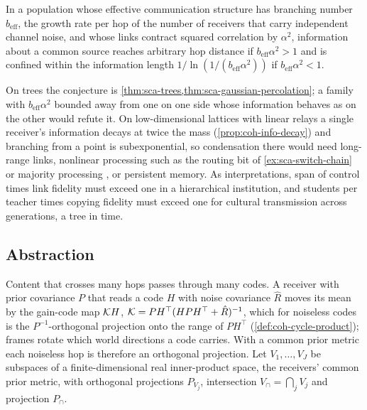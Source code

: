 \begin{conjecture}\label{conj:sca-condensation}
In a population whose effective communication structure has branching number $b_{\mathrm{eff}}$, the growth rate per hop of the number of receivers that carry independent channel noise, and whose links contract squared correlation by $\alpha^2$, information about a common source reaches arbitrary hop distance if $b_{\mathrm{eff}}\alpha^2>1$ and is confined within the information length $1/\ln(1/(b_{\mathrm{eff}}\alpha^2))$ if $b_{\mathrm{eff}}\alpha^2<1$.
\end{conjecture}
On trees the conjecture is \cref{thm:sca-trees,thm:sca-gaussian-percolation}; a family with $b_{\mathrm{eff}}\alpha^2$ bounded away from one on one side whose information behaves as on the other would refute it. On low-dimensional lattices with linear relays a single receiver's information decays at twice the mass (\cref{prop:coh-info-decay}) and branching from a point is subexponential, so condensation there would need long-range links, nonlinear processing such as the routing bit of \cref{ex:sca-switch-chain} or majority processing \citep{makur2020broadcasting}, or persistent memory. As interpretations, span of control times link fidelity must exceed one in a hierarchical institution, and students per teacher times copying fidelity must exceed one for cultural transmission across generations, a tree in time.

\subsection{Abstraction}\label{sec:sca-abstraction}

Content that crosses many hops passes through many codes. A receiver with prior covariance $P$ that reads a code $H$ with noise covariance $\hat R$ moves its mean by the gain-code map $\mathcal{K} H$, $\mathcal{K}=PH^\top(HPH^\top+\hat R)^{-1}$, which for noiseless codes is the $P^{-1}$-orthogonal projection onto the range of $PH^\top$ (\cref{def:coh-cycle-product}); frames rotate which world directions a code carries. With a common prior metric each noiseless hop is therefore an orthogonal projection. Let $V_1,\dots,V_J$ be subspaces of a finite-dimensional real inner-product space, the receivers' common prior metric, with orthogonal projections $P_{V_j}$, intersection $V_\cap=\bigcap_jV_j$ and projection $P_\cap$.

